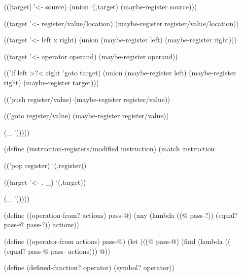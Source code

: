 \begin{Snippet}
    (([target] '<- source)
     (union `(,target) (maybe-register source)))
\end{Snippet}
\begin{Snippet}
    ((target '<- register/value/location)
     (maybe-register register/value/location))
\end{Snippet}
\begin{Snippet}
    ((target '<- left x right)
     (union (maybe-register left) (maybe-register right)))
\end{Snippet}
\begin{Snippet}
    ((target '<- operator operand)
     (maybe-register operand))
\end{Snippet}
\begin{Snippet}
    (('if left >?< right 'goto target)
     (union (maybe-register left) (maybe-register right)
	    (maybe-register target)))
\end{Snippet}
\begin{Snippet}
    (('push register/value)
     (maybe-register register/value))
\end{Snippet}
\begin{Snippet}
    (('goto register/value)
     (maybe-register register/value))
\end{Snippet}
\begin{Snippet}
    (_
     '())))
\end{Snippet}
\begin{Snippet}
(define (instruction-registers/modified instruction)
  (match instruction
\end{Snippet}
\begin{Snippet}
    (('pop register)
     `(,register))
\end{Snippet}
\begin{Snippet}
    ((target '<- . _)
     `(,target))
\end{Snippet}
\begin{Snippet}
    (_
     '())))
\end{Snippet}
\begin{Snippet}
(define ((operation-from? actions) pass-@)
  (any (lambda ((@ pass-?))
	 (equal? pass-@ pass-?))
       actions))
\end{Snippet}
\begin{Snippet}
(define ((operator-from actions) pass-@)
  (let (((@ pass-@) (find (lambda ((%
			    (equal? pass-@ pass-%
			  actions)))
    @))
\end{Snippet}
\begin{Snippet}
(define (defined-function? operator)
  (symbol? operator))
\end{Snippet}
